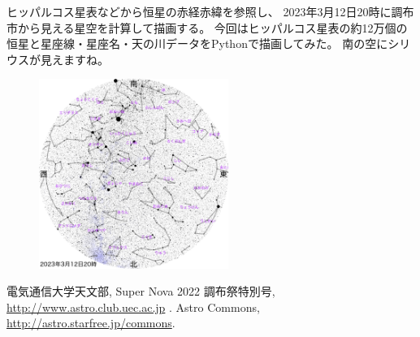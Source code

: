 \documentclass[../../super_nova_2023]{subfiles}
\begin{document}
ヒッパルコス星表などから恒星の赤経赤緯を参照し、
2023年3月12日20時に調布市から見える星空を計算して描画する。
今回はヒッパルコス星表の約12万個の恒星と星座線・星座名・天の川データ\cite{b}をPythonで描画してみた。
南の空にシリウスが見えますね。%
\begin{figure}[h]
	\centering 
	\leavevmode
	\includegraphics[width=0.55\textwidth]{figures/Tadachi/piari.png}
\end{figure}

\vspace{-3mm}
\begin{thebibliography}{1}
	 電気通信大学天文部, Super Nova 2022 調布祭特別号, \url{http://www.astro.club.uec.ac.jp} .
	 Astro Commons, \url{http://astro.starfree.jp/commons}.
\end{thebibliography}
\end{document}

